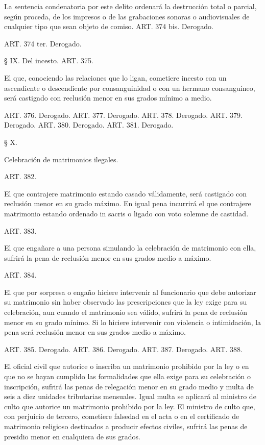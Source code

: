     La sentencia condenatoria por este delito ordenará la destrucción total o parcial, según proceda, de los impresos o de las grabaciones sonoras o audiovisuales de cualquier tipo que sean objeto de comiso.
    ART. 374 bis. Derogado.


    ART. 374 ter. Derogado.


    § IX. Del incesto.
    ART. 375.

    El que, conociendo las relaciones que lo ligan, cometiere incesto con un ascendiente o descendiente por consanguinidad o con un hermano consanguíneo, será castigado con reclusión menor en sus grados mínimo a medio.

    ART. 376. Derogado.
    ART. 377. Derogado.
    ART. 378. Derogado.
    ART. 379. Derogado.
    ART. 380. Derogado.
    ART. 381. Derogado.


    § X.

    Celebración de matrimonios ilegales.





    ART. 382.

    El que contrajere matrimonio estando casado válidamente, será castigado con reclusión menor en su grado máximo.
    En igual pena incurrirá el que contrajere matrimonio estando ordenado in sacris o ligado con voto solemne de castidad.

    ART. 383.

    El que engañare a una persona simulando la celebración de matrimonio con ella, sufrirá la pena de reclusión menor en sus grados medio a máximo.



    ART. 384.

    El que por sorpresa o engaño hiciere intervenir al funcionario que debe autorizar su matrimonio sin haber observado las prescripciones que la ley exige para su celebración, aun cuando el matrimonio sea válido, sufrirá la pena de reclusión menor en su grado mínimo.
    Si lo hiciere intervenir con violencia o intimidación, la pena será reclusión menor en sus grados medio a máximo.

    ART. 385. Derogado.
    ART. 386. Derogado.
    ART. 387. Derogado.
    ART. 388.

    El oficial civil que autorice o inscriba un matrimonio prohibido por la ley o en que no se hayan cumplido las formalidades que ella exige para su celebración o inscripción, sufrirá las penas de relegación menor en su grado medio y multa de seis a diez unidades tributarias mensuales. Igual multa se aplicará al ministro de culto que autorice un matrimonio prohibido por la ley.
    El ministro de culto que, con perjuicio de tercero, cometiere falsedad en el acta o en el certificado de matrimonio religioso destinados a producir efectos civiles, sufrirá las penas de presidio menor en cualquiera de sus grados.


